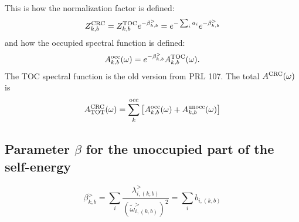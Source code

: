 \documentclass[a4paper,12pt]{article}
\begin{document}
This is how the normalization factor is defined: 
\begin{equation}
  Z_{k,b}^\textnormal{CRC} = Z_{k,b}^\textnormal{TOC} e^{ - \beta_{k,b}^> } =  e^{ - \sum_i a_i }  e^{ - \beta_{k,b}^> } 
\end{equation}
and how the occupied spectral function is defined:
\begin{equation}
  A_{k,b}^\textnormal{occ}(\omega) = e^{ - \beta_{k,b}^> } A_{k,b}^\textnormal{TOC}(\omega) .
\end{equation}
The TOC spectral function is the old version from PRL 107. 
The total $A^\textnormal{CRC}(\omega)$ is 
\begin{equation}
   A_\textnormal{TOT}^\textnormal{CRC}(\omega) = \sum_k^\textnormal{occ} \left[ A_{k,b}^\textnormal{occ}(\omega) + A_{k,b}^\textnormal{unocc}(\omega) \right]
\end{equation}

\subsection{Parameter $\beta$ for the unoccupied part of the self-energy}

\begin{equation}
	\beta_{k,b}^>  = \sum_i \frac{\lambda_{i,(k,b)}^>}{(\tilde\omega_{i,(k,b)}^>)^2} = \sum_i b_{i,(k,b)}
\end{equation}
\end{document}
